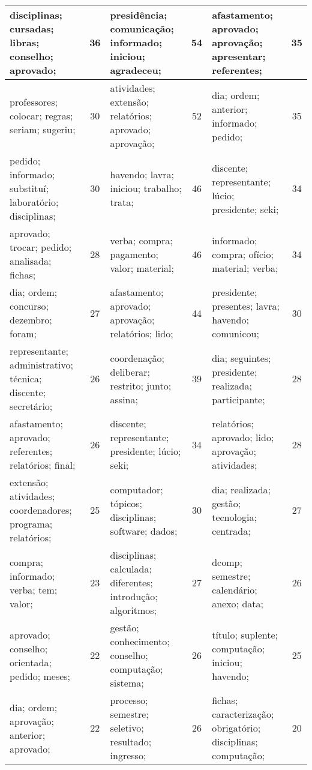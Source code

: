 \begin{table}[!h]
\begin{tabular}{|l|c||l|c||l|c|}
   disciplinas; cursadas; libras; conselho; aprovado;    &   36  &         presidência; comunicação; informado; iniciou; agradeceu;    &   54  &       afastamento; aprovado; aprovação; apresentar; referentes;    &   35  \\ \hline
   professores; colocar; regras; seriam; sugeriu;    &   30  &         atividades; extensão; relatórios; aprovado; aprovação;    &   52  &       dia; ordem; anterior; informado; pedido;    &   35  \\ \hline
   pedido; informado; substituí; laboratório; disciplinas;    &   30  &         havendo; lavra; iniciou; trabalho; trata;    &   46  &       discente; representante; lúcio; presidente; seki;    &   34  \\ \hline
   aprovado; trocar; pedido; analisada; fichas;    &   28  &         verba; compra; pagamento; valor; material;    &   46  &       informado; compra; ofício; material; verba;    &   34  \\ \hline
   dia; ordem; concurso; dezembro; foram;    &   27  &         afastamento; aprovado; aprovação; relatórios; lido;    &   44  &       presidente; presentes; lavra; havendo; comunicou;    &   30  \\ \hline
   representante; administrativo; técnica; discente; secretário;    &   26  &         coordenação; deliberar; restrito; junto; assina;    &   39  &       dia; seguintes; presidente; realizada; participante;    &   28  \\ \hline
   afastamento; aprovado; referentes; relatórios; final;    &   26  &         discente; representante; presidente; lúcio; seki;    &   34  &       relatórios; aprovado; lido; aprovação; atividades;    &   28  \\ \hline
   extensão; atividades; coordenadores; programa; relatórios;    &   25  &         computador; tópicos; disciplinas; software; dados;    &   30  &       dia; realizada; gestão; tecnologia; centrada;    &   27  \\ \hline
   compra; informado; verba; tem; valor;    &   23  &         disciplinas; calculada; diferentes; introdução; algoritmos;    &   27  &       dcomp; semestre; calendário; anexo; data;    &   26  \\ \hline
   aprovado; conselho; orientada; pedido; meses;    &   22  &         gestão; conhecimento; conselho; computação; sistema;    &   26  &       título; suplente; computação; iniciou; havendo;    &   25  \\ \hline
   dia; ordem; aprovação; anterior; aprovado;    &   22  &         processo; semestre; seletivo; resultado; ingresso;    &   26  &       fichas; caracterização; obrigatório; disciplinas; computação;    &   20  \\ \hline

\end{tabular}
\end{table}
